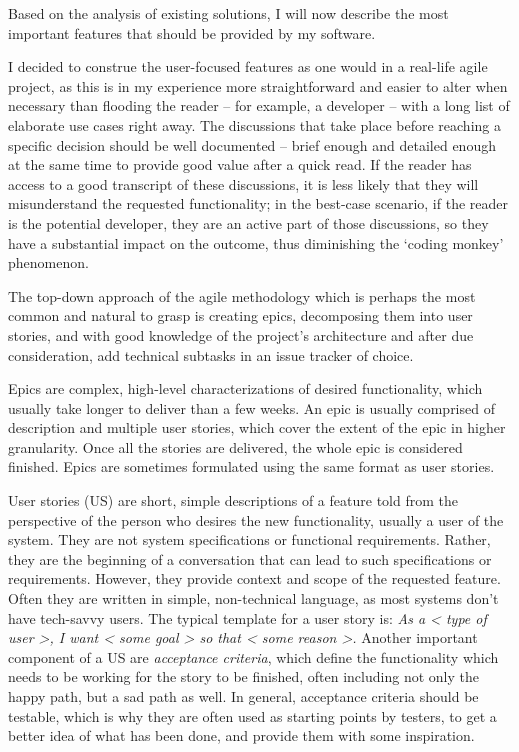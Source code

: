 \linebreak
Based on the analysis of existing solutions, I will now describe the most important features that should be provided by my software.

I decided to construe the user-focused features as one would in a real-life agile project,
as this is in my experience more straightforward and easier to alter when necessary than flooding the reader -- for example, a developer -- with a long list of elaborate use cases right away.
The discussions that take place before reaching a specific decision should be well documented -- brief enough and detailed enough at the same time to provide good value after a quick read.
If the reader has access to a good transcript of these discussions, it is less likely that they will misunderstand the requested functionality;
in the best-case scenario, if the reader is the potential developer, they are an active part of those discussions, so they have a substantial impact on the outcome, thus diminishing the `coding monkey' phenomenon.

The top-down approach of the agile methodology which is perhaps the most common and natural to grasp is creating epics, decomposing them into user stories,
and with good knowledge of the project's architecture and after due consideration, add technical subtasks in an issue tracker of choice.

Epics are complex, high-level characterizations of desired functionality, which usually take longer to deliver than a few weeks.
An epic is usually comprised of description and multiple user stories, which cover the extent of the epic in higher granularity.
Once all the stories are delivered, the whole epic is considered finished.
Epics are sometimes formulated using the same format as user stories.

User stories (US) are short, simple descriptions of a feature told from the perspective of the person who desires the new functionality, usually a user of the system.\cite{user-story-definition}
They are not system specifications or functional requirements.
Rather, they are the beginning of a conversation that can lead to such specifications or requirements.
However, they provide context and scope of the requested feature.
Often they are written in simple, non-technical language, as most systems don't have tech-savvy users.
The typical template for a user story is:
\textit{As a < type of user >, I want < some goal > so that < some reason >.}\cite{user-story-definition}
Another important component of a US are \textit{acceptance criteria}, which define the functionality which needs to be working for the story to be finished, often including not only the happy path, but a sad path as well.
In general, acceptance criteria should be testable, which is why they are often used as starting points by testers, to get a better idea of what has been done, and provide them with some inspiration.

